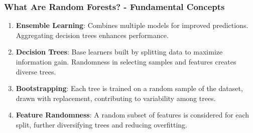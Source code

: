 \documentclass[aspectratio=169]{beamer}
\begin{document}
\begin{frame}[fragile]
  \frametitle{What Are Random Forests? - Fundamental Concepts}
  \begin{enumerate}
    \item \textbf{Ensemble Learning}: Combines multiple models for improved predictions. Aggregating decision trees enhances performance.
    
    \item \textbf{Decision Trees}: Base learners built by splitting data to maximize information gain. Randomness in selecting samples and features creates diverse trees.
    
    \item \textbf{Bootstrapping}: Each tree is trained on a random sample of the dataset, drawn with replacement, contributing to variability among trees.
    
    \item \textbf{Feature Randomness}: A random subset of features is considered for each split, further diversifying trees and reducing overfitting.
  \end{enumerate}
\end{frame}
\end{document}
